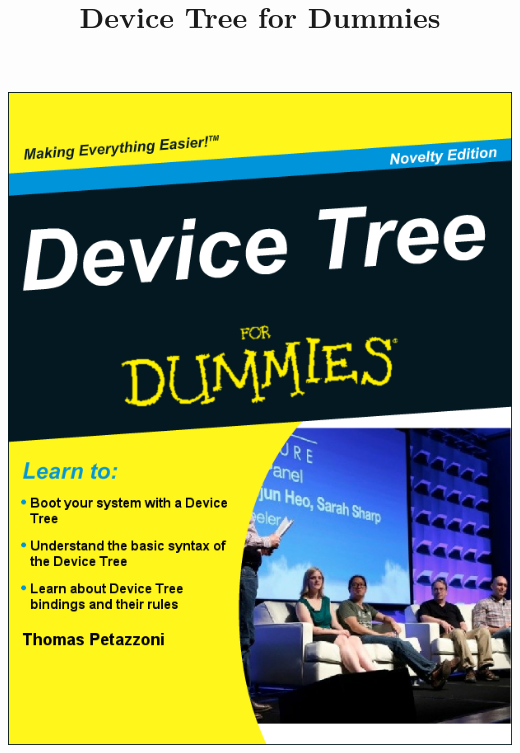 \documentclass[obeyspaces,spaces,hyphens]{beamer}
\title{Device Tree for Dummies}
\institute{Bootlin}
\begin{document}
\begin{frame}
  \begin{center}
    \includegraphics[height=0.95\textheight]{device-tree-for-dummies.png}
  \end{center}
\end{frame}
\end{document}
